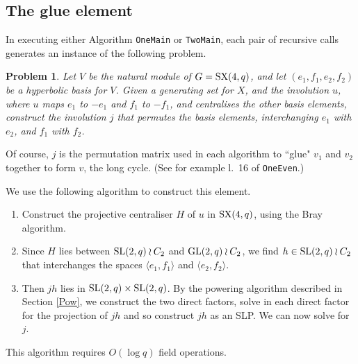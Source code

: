 \documentclass[12pt]{article}
\newtheorem{lemma}[definition]{Lemma}
\newtheorem{problem}[definition]{Problem}
\def\SL{{\rm SL}}
\def\GL{{\rm GL}}
\def\GF{{\rm GF}}
\def\SX{{\rm SX}}
\begin{document}

\subsection{The glue element}
In executing either Algorithm {\tt OneMain} or {\tt TwoMain}, 
each pair of recursive calls generates
an instance of the following problem.

\begin{problem}
Let $V$ be the natural module of  $G=\SX(4,q)$, and let
$(e_1,f_1,e_2,f_2)$ be a hyperbolic basis for $V$. Given a generating
set for $X$, and the involution $u$, where $u$ maps $e_1$ to $-e_1$
and $f_1$ to $-f_1$, and centralises the other basis
elements, construct the involution  $j$  that permutes the basis
elements, interchanging $e_1$ with $e_2$, and $f_1$ with $f_2$.
\end{problem}

Of course, $j$ is the permutation matrix used
in each algorithm to ``glue" $v_1$ and $v_2$ together to 
form $v$, the long cycle. 
(See for example l.\ 16 of {\tt OneEven}.)

We use the following algorithm to construct this element. 
\begin{enumerate}
\item 
Construct the projective
centraliser $H$ of $u$ in $\SX(4,q)$, using the Bray algorithm. 

\item 
Since $H$ lies between $\SL(2,q)\wr C_2$ and
$\GL(2,q) \wr C_2$, we find $h\in\SL(2,q)\wr C_2$ that
interchanges the spaces $\langle e_1,f_1\rangle$ and $\langle
e_2,f_2\rangle$. 

\item Then $jh$ lies in $\SL(2,q)\times\SL(2,q)$.  By the
powering algorithm described in Section \ref{Pow}, 
we construct the two direct factors, solve in each
direct factor for the projection of $jh$ and so 
construct $jh$ as an SLP. We can now solve for $j$.
\end{enumerate}
This algorithm requires $O(\log q)$ field operations.
\end{document}
